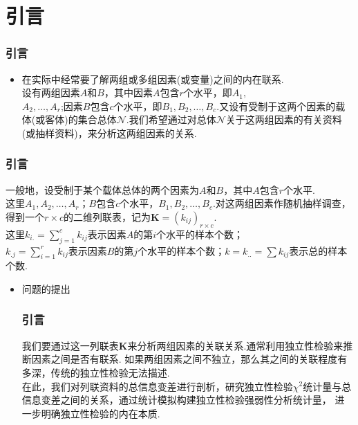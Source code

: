 \section{引言}
\begin{frame}\frametitle{引言}
\begin{itemize}
 \item \color{magenta}{$r\times c$的二维列联表}
 \vskip0.5cm
  \quad\quad
\begin{small}
\color{blue}在实际中经常要了解两组或多组因素(或变量)之间的内在联系.\\
\quad\quad 设有两组因素$A$和$B$，其中因素$A$包含$r$个水平，即$A_{1},$\\$A_{2},\ldots,A_{r}$;因素$B$包含$c$个水平，即$B_{1},B_{2},\ldots,B_{c}$.又设有受制于这两个因素的载体(或客体)的集合总体$\mathcal{N}$.我们希望通过对总体$\mathcal{N}$关于这两组因素的有关资料(或抽样资料)，来分析这两组因素的关系.\\

\end{small}
\end{itemize}
\end{frame}


\begin{frame}
\frametitle{引言}
\begin{small}
\quad\quad
一般地，设受制于某个载体总体的两个因素为$A$和$B$，其中$A$包含$r$个水平.\\

\quad\quad
这里$A_{1},A_{2},\ldots,A_{r}$；$B$包含$c$个水平，$B_{1},B_{2},\ldots,B_{c}$.对这两组因素作随机抽样调查，
\color{magenta}得到一个$r\times c$的二维列联表，记为$\mathbf{K}=(k_{ij})_{r\times c}$.\\
\color{blue}
\quad\quad
这里$k_{i.}=\sum^{c}_{j=1}k_{ij}$表示因素$A$的第$i$个水平的样本个数；\\
$k_{.j}=\sum^{r}_{i=1}k_{ij}$表示因素$B$的第$j$个水平的样本个数；$k=k_{..}=\sum k_{ij}$表示总的样本个数.\\
\end{small}
\end{frame}

\begin{frame}
\begin{itemize}
 \item {\color{magenta}问题的提出}
 \vskip0.5cm
\frametitle{引言} \quad\quad
我们要通过这一列联表$\mathbf{K}$来分析两组因素的关联关系.通常利用独立性检验来推断因素之间是否有联系.
{\color{blue}如果两组因素之间不独立，那么其之间的关联程度有多深，传统的独立性检验无法描述.}\\
\quad\quad
在此，我们对列联资料的总信息变差进行剖析，{\color{magenta}研究独立性检验$\chi^2$统计量与总信息变差之间的关系，}通过统计模拟构建独立性检验强弱性分析统计量，
进一步明确独立性检验的内在本质.
\end{itemize}

\end{frame}

